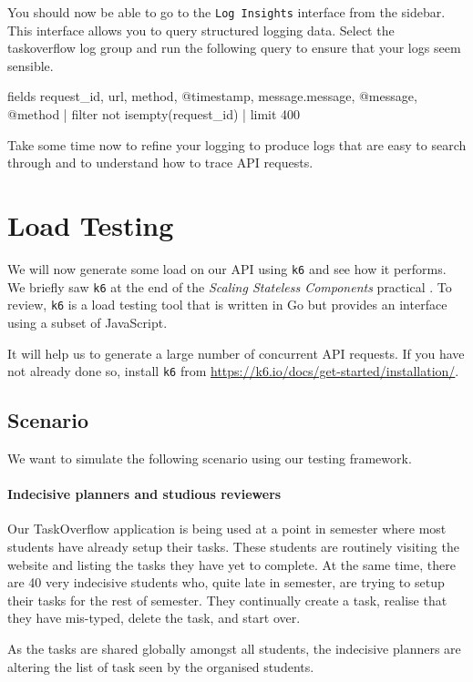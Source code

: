 \documentclass{csse4400}
\begin{document}
You should now be able to go to the \texttt{Log Insights} interface from the sidebar.
This interface allows you to query structured logging data.
Select the taskoverflow log group and
run the following query to ensure that your logs seem sensible.
%
\begin{code}[numbers=none]{}
fields request_id, url, method, @timestamp, message.message, @message, @method
| filter not isempty(request_id)
| limit 400
\end{code}

Take some time now to refine your logging to produce logs that are easy to search through
and to understand how to trace API requests.


\section{Load Testing}

We will now generate some load on our API using \texttt{k6} and see how it performs.
We briefly saw \texttt{k6} at the end of the \textit{Scaling Stateless Components} practical \cite{prac-week6}.
To review, \texttt{k6} is a load testing tool that is written in Go but provides an interface using a subset of JavaScript.

It will help us to generate a large number of concurrent API requests.
If you have not already done so, install \texttt{k6} from
\url{https://k6.io/docs/get-started/installation/}.

\subsection{Scenario}
We want to simulate the following scenario using our testing framework.

\paragraph{Indecisive planners and studious reviewers}
Our TaskOverflow application is being used at a point in semester where most students have already setup their tasks.
These students are routinely visiting the website and listing the tasks they have yet to complete.
At the same time, there are 40 very indecisive students who,
quite late in semester,
are trying to setup their tasks for the rest of semester.
They continually create a task,
realise that they have mis-typed,
delete the task,
and start over.

As the tasks are shared globally amongst all students,
the indecisive planners are altering the list of task seen by the organised students.
\end{document}
